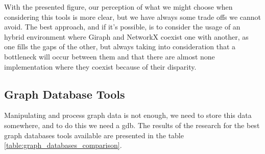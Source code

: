 With the presented figure, our perception of what we might choose when considering this tools is more clear, but we have always some trade offs we cannot avoid. The best approach, and if it's possible, is to consider the usage of an hybrid environment where Giraph and NetworkX coexist one with another, as one fills the gaps of the other, but always taking into consideration that a bottleneck will occur between them \cite{graph_frameworks_performance_evaluation} and that there are almost none implementation where they coexist \cite{graph_frameworks_performance_evaluation} because of their disparity.

\subsection{Graph Database Tools}
\label{subsec:graph_database_tools}


Manipulating and process graph data is not enough, we need to store this data somewhere, and to do this we need a \gls{gdb}. The results of the research for the best graph databases tools available are presented in the table \ref{table:graph_databases_comparison}.

